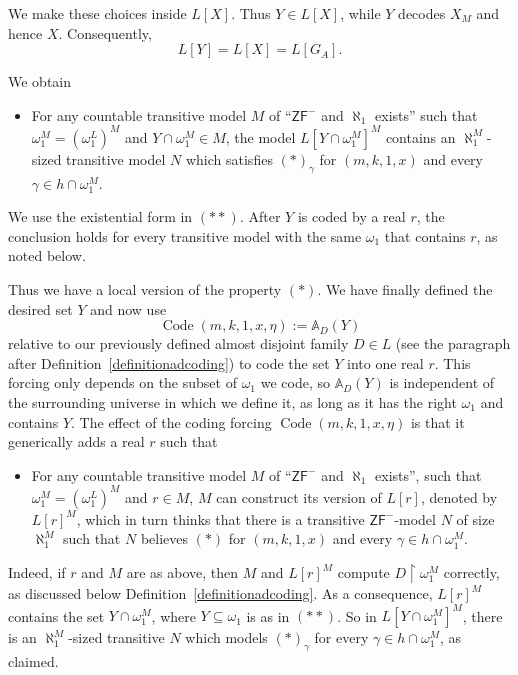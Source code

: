 \documentclass[a4paper,11pt]{article}
\newcommand{\ZFP}{\mathsf{ZF}^-}
\begin{document}
     We make these choices inside $L[X]$. Thus $Y\in L[X]$, while $Y$ decodes $X_M$ and hence $X$. Consequently,
     \[
     L[Y]=L[X]=L[G_A].
     \]

     We obtain
     \begin{itemize}
     \item[$({\ast}{\ast})$] For any countable transitive model $M$ of ``$\ZFP$ and $\aleph_1$ exists'' such that $\omega_1^M=(\omega_1^L)^M$ and $Y\cap\omega_1^M\in M$, the model $L[Y\cap\omega_1^M]^M$ contains an $\aleph_1^M$-sized transitive model $N$ which satisfies $(\ast)_\gamma$ for $(m,k,1,x)$ and every $\gamma\in h\cap\omega_1^M$.
     \end{itemize}

     We use the existential form in $({\ast}{\ast})$. After $Y$ is coded by a real $r$, the conclusion holds for every transitive model with the same $\omega_1$ that contains $r$, as noted below.

     Thus we have a local version of the property $(\ast)$. We have finally defined the desired set $Y$ and now use
     \[
     \operatorname{Code}(m,k,1,x,\eta):=\mathbb A_D(Y)
     \]
     relative to our previously defined almost disjoint family $D\in L$ (see the paragraph after Definition~\ref{definitionadcoding}) to code the set $Y$ into one real $r$. This forcing only depends on the subset of $\omega_1$ we code, so $\mathbb A_D(Y)$ is independent of the surrounding universe in which we define it, as long as it has the right $\omega_1$ and contains $Y$. The effect of the coding forcing $\operatorname{Code}(m,k,1,x,\eta)$ is that it generically adds a real $r$ such that
     \begin{itemize}
     \item[$({\ast}{\ast}{\ast})$] For any countable transitive model $M$ of ``$\ZFP$ and $\aleph_1$ exists'', such that $\omega_1^M=(\omega_1^L)^M$ and $r\in M$, $M$ can construct its version of $L[r]$, denoted by $L[r]^M$, which in turn thinks that there is a transitive $\ZFP$-model $N$ of size $\aleph_1^M$ such that $N$ believes $(\ast)$ for $(m,k,1,x)$ and every $\gamma\in h\cap\omega_1^M$.
     \end{itemize}

     Indeed, if $r$ and $M$ are as above, then $M$ and $L[r]^M$ compute $D\upharpoonright\omega_1^M$ correctly, as discussed below Definition~\ref{definitionadcoding}. As a consequence, $L[r]^M$ contains the set $Y\cap\omega_1^M$, where $Y\subseteq\omega_1$ is as in $({\ast}{\ast})$. So in $L[Y\cap\omega_1^M]^M$, there is an $\aleph_1^M$-sized transitive $N$ which models $(\ast)_\gamma$ for every $\gamma\in h\cap\omega_1^M$, as claimed.
\end{document}
